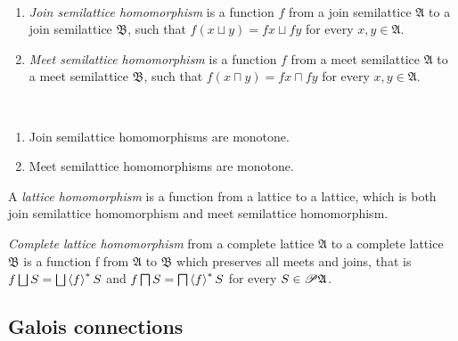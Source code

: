\begin{defn}
~
\begin{enumerate}
\item {}\emph{Join semilattice homomorphism}
is a function $f$ from a join semilattice $\mathfrak{A}$ to a join
semilattice $\mathfrak{B}$, such that $f(x\sqcup y)=fx\sqcup fy$
for every $x,y\in\mathfrak{A}$.
\item {}\emph{Meet semilattice homomorphism}
is a function $f$ from a meet semilattice $\mathfrak{A}$ to a meet
semilattice $\mathfrak{B}$, such that $f(x\sqcap y)=fx\sqcap fy$
for every $x,y\in\mathfrak{A}$.
\end{enumerate}
\end{defn}
\begin{obvious}
~
\begin{enumerate}
\item Join semilattice homomorphisms are monotone.
\item Meet semilattice homomorphisms are monotone.
\end{enumerate}
\end{obvious}
\begin{defn}
A \emph{lattice homomorphism} is a function
from a lattice to a lattice, which is both join semilattice homomorphism
and meet semilattice homomorphism.
\end{defn}

\begin{defn}
\emph{Complete lattice homomorphism}
from a complete lattice $\mathfrak{A}$ to a complete lattice $\mathfrak{B}$
is a function f from $\mathfrak{A}$ to $\mathfrak{B}$ which preserves
all meets and joins, that is $f\bigsqcup S=\bigsqcup\rsupfun fS$
and $f\bigsqcap S=\bigsqcap\left\langle f\right\rangle ^{\ast}S$ for every $S\in\mathscr{P}\mathfrak{A}$.
\end{defn}

\subsection{Galois connections}

